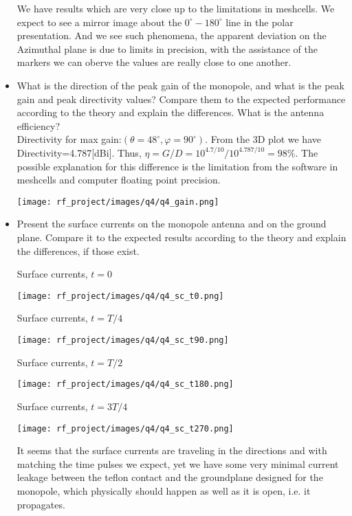 \documentclass[12pt, letterpaper]{article}
\begin{document}
\begin{itemize}
  {\color{blue} We have results which are very close up to the limitations in meshcells. We expect to see a mirror image about the $0^{\circ}-180^{\circ}$ line in the polar presentation. And we see such phenomena, the apparent deviation on the Azimuthal plane is due to limits in precision, with the assistance of the markers we can oberve the values are really close to one another.}

  \item What is the direction of the peak gain of the monopole, and what is the peak gain and peak directivity values? Compare them to the expected performance according to the theory and explain the differences. What is the antenna efficiency?
  \\
  {\color{blue}Directivity for max gain:$(\theta=48^{\circ}, \varphi=90^{\circ})$. From the 3D plot we have Directivity=4.787[dBi]. Thus, $\eta=G/D=10^{4.7/10}/10^{4.787/10}=98\%$. The possible explanation for this difference is the limitation from the software in meshcells and computer floating point precision.}
  \vspace{1em}
  \pagebreak

  \texttt{[image: rf\_project/images/q4/q4\_gain.png]}
  \item Present the surface currents on the monopole antenna and on the ground plane. Compare it to the expected results according to the theory and explain the differences, if those exist.
  \pagebreak
  \begin{center}
    Surface currents, $t=0$
  \end{center}
  \texttt{[image: rf\_project/images/q4/q4\_sc\_t0.png]}
  \pagebreak
  \begin{center}
    Surface currents, $t=T/4$
  \end{center}
  \texttt{[image: rf\_project/images/q4/q4\_sc\_t90.png]}
  \pagebreak
  \begin{center}
    Surface currents, $t=T/2$
  \end{center}
  \texttt{[image: rf\_project/images/q4/q4\_sc\_t180.png]}
  \pagebreak
  \begin{center}
    Surface currents, $t=3T/4$
  \end{center}
  \texttt{[image: rf\_project/images/q4/q4\_sc\_t270.png]}

  {\color{blue}It seems that the surface currents are traveling in the directions and with matching the time pulses we expect, yet we have some very minimal current leakage between the teflon contact and the groundplane designed for the monopole, which physically should happen as well as it is open, i.e. it propagates.}
\end{itemize}
\end{document}
